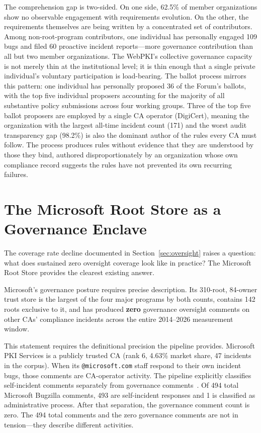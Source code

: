 \documentclass[10pt,twocolumn,letterpaper]{article}
\begin{document}
The comprehension gap is two-sided. On one side, 62.5\% of member
organizations show no observable engagement with requirements evolution.
On the other, the requirements themselves are being written by a
concentrated set of contributors. Among non-root-program contributors,
one individual has personally engaged 109 bugs and filed 60 proactive
incident reports---more governance contribution than all but two member
organizations. The WebPKI's collective governance capacity is not merely
thin at the institutional level; it is thin enough that a single private
individual's voluntary participation is load-bearing. The ballot process
mirrors this pattern: one individual has personally proposed 36 of the
Forum's ballots, with the top five individual proposers accounting for
the majority of all substantive policy submissions across four working
groups. Three of the top five ballot proposers are employed by a single
CA operator (DigiCert), meaning the organization with the largest all-time
incident count (171) and the worst audit transparency gap (98.2\%) is also
the dominant author of the rules every CA must follow. The process produces
rules without evidence that they are understood by those they bind,
authored disproportionately by an organization whose own compliance record
suggests the rules have not prevented its own recurring failures.

\section{The Microsoft Root Store as a Governance Enclave}
\label{sec:microsoft}

The coverage rate decline documented in Section~\ref{sec:oversight} raises
a question: what does sustained zero oversight coverage look like in
practice? The Microsoft Root Store provides the clearest existing answer.

Microsoft's governance posture requires precise description. Its 310-root,
84-owner trust store is the largest of the four major programs by both
counts, contains 142 roots exclusive to it, and has produced
\textbf{zero} governance oversight comments on other CAs' compliance
incidents across the entire 2014--2026 measurement window.

This statement requires the definitional precision the pipeline provides.
Microsoft PKI Services is a publicly trusted CA (rank 6, 4.63\% market
share, 47 incidents in the corpus). When its \texttt{@microsoft.com} staff
respond to their own incident bugs, those comments are CA-operator activity.
The pipeline explicitly classifies self-incident comments separately from
governance comments~\cite{github-code}. Of 494 total Microsoft Bugzilla
comments, 493 are self-incident responses and 1 is classified as
administrative process. After that separation, the governance comment count
is zero. The 494 total comments and the zero governance comments are not
in tension---they describe different activities.
\end{document}
